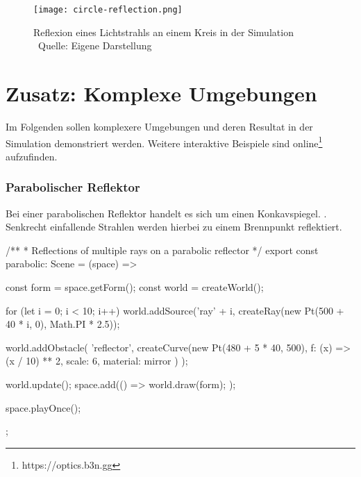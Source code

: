 
\begin{figure}
    \centering
    \texttt{[image: circle-reflection.png]}

    \caption{Reflexion eines Lichtstrahls an einem Kreis in der Simulation  \\ Quelle: Eigene Darstellung}

\end{figure}

\chapter*{Zusatz: Komplexe Umgebungen}
Im Folgenden sollen komplexere Umgebungen und deren Resultat in der Simulation demonstriert werden. 
Weitere interaktive Beispiele sind online\footnote{https://optics.b3n.gg} aufzufinden.
\newpage
\subsection*{Parabolischer Reflektor}
Bei einer parabolischen Reflektor handelt es sich um einen Konkavspiegel. \parencite[vgl.][S. 362]{kuchling2004taschenbuch}.
Senkrecht einfallende Strahlen werden hierbei zu einem Brennpunkt reflektiert. 

\begin{verbnobox}[\scriptsize\mbox{}]
/**
* Reflections of multiple rays on a parabolic reflector
*/
export const parabolic: Scene = (space) => {
    const form = space.getForm();
    const world = createWorld();

    for (let i = 0; i < 10; i++) {
        world.addSource('ray' + i, createRay(new Pt(500 + 40 * i, 0), Math.PI * 2.5));
    }

    world.addObstacle(
        'reflector',
        createCurve(new Pt(480 + 5 * 40, 500), { f: (x) => (x / 10) ** 2, scale: 6, material: mirror })
    );

    world.update();
    space.add(() => {
        world.draw(form);
    });

    space.playOnce();
};
\end{verbnobox}

